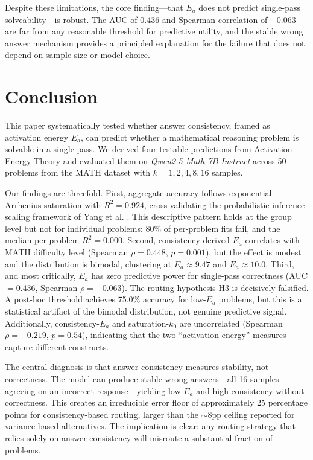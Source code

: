\documentclass{article}
\begin{document}
Despite these limitations, the core finding---that $E_a$ does not predict single-pass solveability---is robust. The AUC of 0.436 and Spearman correlation of $-0.063$ are far from any reasonable threshold for predictive utility, and the stable wrong answer mechanism provides a principled explanation for the failure that does not depend on sample size or model choice.

\section{Conclusion}
\label{sec:conclusion}

This paper systematically tested whether answer consistency, framed as activation energy $E_a$, can predict whether a mathematical reasoning problem is solvable in a single pass. We derived four testable predictions from Activation Energy Theory and evaluated them on \textit{Qwen2.5-Math-7B-Instruct} across 50 problems from the MATH dataset with $k = 1, 2, 4, 8, 16$ samples.

Our findings are threefold. First, aggregate accuracy follows exponential Arrhenius saturation with $R^2 = 0.924$, cross-validating the probabilistic inference scaling framework of Yang et al. \citep{yang2024probabilistic}. This descriptive pattern holds at the group level but not for individual problems: 80\% of per-problem fits fail, and the median per-problem $R^2 = 0.000$. Second, consistency-derived $E_a$ correlates with MATH difficulty level (Spearman $\rho = 0.448$, $p = 0.001$), but the effect is modest and the distribution is bimodal, clustering at $E_a \approx 9.47$ and $E_a \approx 10.0$. Third, and most critically, $E_a$ has zero predictive power for single-pass correctness (AUC $= 0.436$, Spearman $\rho = -0.063$). The routing hypothesis H3 is decisively falsified. A post-hoc threshold achieves 75.0\% accuracy for low-$E_a$ problems, but this is a statistical artifact of the bimodal distribution, not genuine predictive signal. Additionally, consistency-$E_a$ and saturation-$k_0$ are uncorrelated (Spearman $\rho = -0.219$, $p = 0.54$), indicating that the two ``activation energy'' measures capture different constructs.

The central diagnosis is that answer consistency measures stability, not correctness. The model can produce stable wrong answers---all 16 samples agreeing on an incorrect response---yielding low $E_a$ and high consistency without correctness. This creates an irreducible error floor of approximately 25 percentage points for consistency-based routing, larger than the $\sim$8pp ceiling reported for variance-based alternatives. The implication is clear: any routing strategy that relies solely on answer consistency will misroute a substantial fraction of problems.
\end{document}
